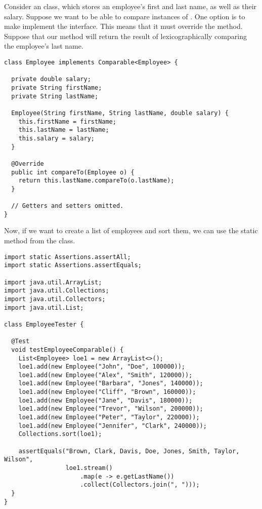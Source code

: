 Consider an  class, which stores an employee's first and last name, as well as their salary. Suppose we want to be able to compare instances of . One option is to make  implement the  interface. This means that it must override the  method. Suppose that our method will return the result of lexicographically comparing the employee's last name.

\begin{lstlisting}[language=MyJava]
class Employee implements Comparable<Employee> {

  private double salary;
  private String firstName;
  private String lastName;

  Employee(String firstName, String lastName, double salary) {
    this.firstName = firstName;
    this.lastName = lastName;
    this.salary = salary;
  }

  @Override
  public int compareTo(Employee o) {
    return this.lastName.compareTo(o.lastName);
  }

  // Getters and setters omitted.
}
\end{lstlisting}

Now, if we want to create a list of employees and sort them, we can use the static  method from the  class. 

\begin{lstlisting}[language=MyJava]
import static Assertions.assertAll;
import static Assertions.assertEquals;

import java.util.ArrayList;
import java.util.Collections;
import java.util.Collectors;
import java.util.List;

class EmployeeTester {

  @Test
  void testEmployeeComparable() {
    List<Employee> loe1 = new ArrayList<>();
    loe1.add(new Employee("John", "Doe", 100000));
    loe1.add(new Employee("Alex", "Smith", 120000));
    loe1.add(new Employee("Barbara", "Jones", 140000));
    loe1.add(new Employee("Cliff", "Brown", 160000));
    loe1.add(new Employee("Jane", "Davis", 180000));
    loe1.add(new Employee("Trevor", "Wilson", 200000));
    loe1.add(new Employee("Peter", "Taylor", 220000));
    loe1.add(new Employee("Jennifer", "Clark", 240000));
    Collections.sort(loe1);

    assertEquals("Brown, Clark, Davis, Doe, Jones, Smith, Taylor, Wilson",
                 loe1.stream()
                     .map(e -> e.getLastName())
                     .collect(Collectors.join(", ")));
  }
}
\end{lstlisting}

